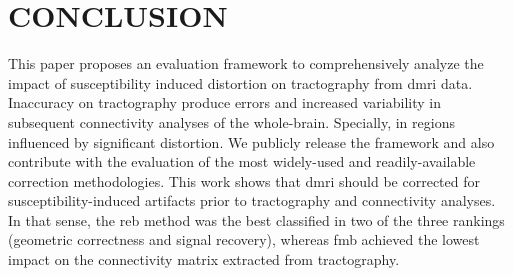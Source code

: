 \section{CONCLUSION}

This paper proposes an evaluation framework to
comprehensively analyze the impact of susceptibility
induced distortion on tractography from \gls*{dmri}
data. Inaccuracy on tractography produce errors
and increased variability in subsequent connectivity 
analyses of the whole-brain. Specially, in regions 
influenced by  significant distortion.
We publicly release the framework and also contribute
with the evaluation of the most widely-used and
readily-available correction methodologies. 
This work shows that \gls*{dmri} should be corrected
for susceptibility-induced artifacts prior to tractography
and connectivity analyses. In that sense, the \gls*{reb} 
method was the best classified
in two of the three rankings (geometric 
correctness and signal recovery), whereas \gls*{fmb}
achieved the lowest impact on the connectivity matrix
extracted from tractography.